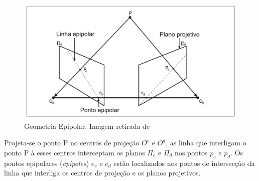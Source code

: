 \begin{figure}[H]
 	\centering
 	\includegraphics[scale=0.35]{./Resources/geometry_epipolar.png}
 	\caption{Geometria Epipolar. Imagem retirada de \cite{Mendes2012}}
 	\label{geometry_epipolar}
\end{figure}

Projeta-se o ponto P no centros de projeção $O^e$ e $O^d$, as linha que interligam o ponto P à esses centros interceptam os planos $\Pi_e$ e $\Pi_d$ nos pontos $p_e$ e $p_d$. Os pontos epipolares (\textit{epipoles}) $e_e$ e $e_d$ estão localizados nos pontos de intersecção da linha que interliga os centros de projeção e os planos projetivos. 




